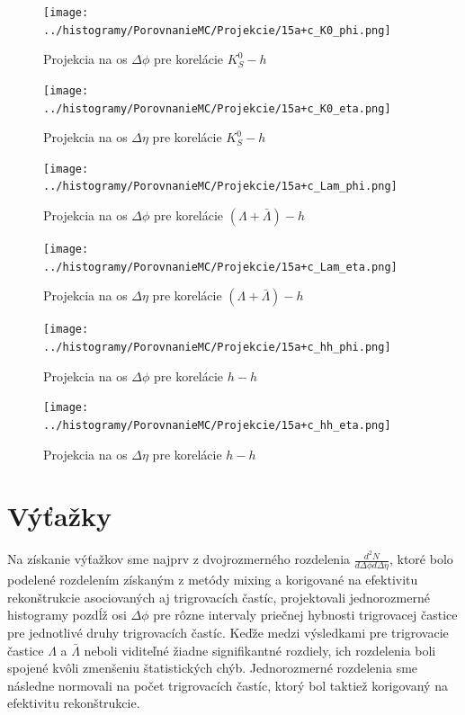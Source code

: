 \documentclass[thesismargins, thesislinespacing]{rnthesis}
\begin{document}
\begin{figure}
	\centering
	\texttt{[image: ../histogramy/PorovnanieMC/Projekcie/15a+c\_K0\_phi.png]}
	\caption{Projekcia na os $\Delta \phi$ pre korelácie $K^0_S - h$}
	\label{K0phi}
\end{figure}

\begin{figure}
	\centering
	\texttt{[image: ../histogramy/PorovnanieMC/Projekcie/15a+c\_K0\_eta.png]}
	\caption{Projekcia na os $\Delta \eta$ pre korelácie $K^0_S - h$}
	\label{K0eta}
\end{figure}
\begin{figure}
\centering
\texttt{[image: ../histogramy/PorovnanieMC/Projekcie/15a+c\_Lam\_phi.png]}
\caption{Projekcia na os $\Delta \phi$ pre korelácie $(\Lambda + \bar{\Lambda})- h$}
\label{Lamphi}
\end{figure}
\begin{figure}
	\centering
	\texttt{[image: ../histogramy/PorovnanieMC/Projekcie/15a+c\_Lam\_eta.png]}
	\caption{Projekcia na os $\Delta \eta$ pre korelácie $(\Lambda + \bar{\Lambda})- h$}
	\label{Lameta}
\end{figure}

\begin{figure}
	\centering
	\texttt{[image: ../histogramy/PorovnanieMC/Projekcie/15a+c\_hh\_phi.png]}
	\caption{Projekcia na os $\Delta \phi$ pre korelácie $h - h$}
	\label{hphi}
\end{figure}

\begin{figure}
	\centering
	\texttt{[image: ../histogramy/PorovnanieMC/Projekcie/15a+c\_hh\_eta.png]}
	\caption{Projekcia na os $\Delta \eta$ pre korelácie $h - h$}
	\label{heta}
\end{figure}



\section{Výťažky}

Na získanie výťažkov sme najprv z dvojrozmerného rozdelenia $\frac{d^2N}{d\Delta \phi d\Delta \eta}$, ktoré bolo podelené rozdelením získaným z metódy mixing a korigované na efektivitu rekonštrukcie asociovaných aj trigrovacích častíc, projektovali jednorozmerné histogra\-my pozdĺž osi $\Delta\phi$ pre rôzne intervaly priečnej hybnosti trigrovacej častice pre jednotlivé druhy trigrovacích častíc. Keďže medzi  výsledkami pre trigrovacie častice $\Lambda$ a $\bar{\Lambda}$ neboli viditeľné žiadne signifikantné rozdiely, ich rozdelenia boli spojené kvôli zmenšeniu štatistických chýb. Jednorozmerné rozdelenia sme následne normovali na počet trigrovacích častíc, ktorý bol taktiež korigovaný na efektivitu rekonštrukcie. 
\end{document}
